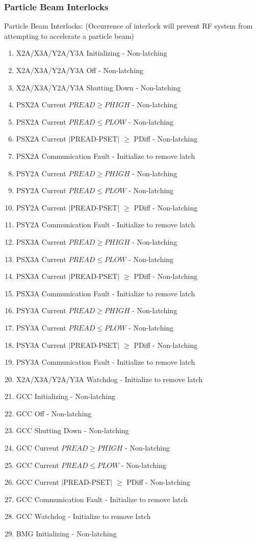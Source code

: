\documentclass[11pt]{book}		%
\begin{document}
\subsubsection{Particle Beam Interlocks}

Particle Beam Interlocks:
(Occurrence of interlock will prevent RF system from attempting to accelerate a particle beam)

\begin{enumerate}
 \item X2A/X3A/Y2A/Y3A Initializing - Non-latching
 \item X2A/X3A/Y2A/Y3A Off - Non-latching
 \item X2A/X3A/Y2A/Y3A Shutting Down - Non-latching
 \item PSX2A Current $PREAD \geq PHIGH$ - Non-latching
 \item PSX2A Current $PREAD \leq PLOW$ - Non-latching
 \item PSX2A Current $\mid$PREAD-PSET$\mid$  $\geq$ PDiff - Non-latching
 \item PSX2A Communication Fault - Initialize to remove latch
 \item PSY2A Current $PREAD \geq PHIGH$ - Non-latching
 \item PSY2A Current $PREAD \leq PLOW$ - Non-latching
 \item PSY2A Current $\mid$PREAD-PSET$\mid$  $\geq$ PDiff - Non-latching
 \item PSY2A Communication Fault - Initialize to remove latch
 \item PSX3A Current $PREAD \geq PHIGH$ - Non-latching
 \item PSX3A Current $PREAD \leq PLOW$ - Non-latching
 \item PSX3A Current $\mid$PREAD-PSET$\mid$  $\geq$ PDiff - Non-latching
 \item PSX3A Communication Fault - Initialize to remove latch
 \item PSY3A Current $PREAD \geq PHIGH$ - Non-latching
 \item PSY3A Current $PREAD \leq PLOW$ - Non-latching
 \item PSY3A Current $\mid$PREAD-PSET$\mid$  $\geq$ PDiff - Non-latching
 \item PSY3A Communication Fault - Initialize to remove latch
 \item X2A/X3A/Y2A/Y3A Watchdog - Initialize to remove latch
 \item GCC Initializing - Non-latching
 \item GCC Off - Non-latching
 \item GCC Shutting Down - Non-latching
 \item GCC Current $PREAD \geq PHIGH$ - Non-latching
 \item GCC Current $PREAD \leq PLOW$ - Non-latching
 \item GCC Current $\mid$PREAD-PSET$\mid$  $\geq$ PDiff - Non-latching
 \item GCC Communication Fault - Initialize to remove latch
 \item GCC Watchdog - Initialize to remove latch
 \item BMG Initializing - Non-latching


\end{enumerate}
\end{document}
